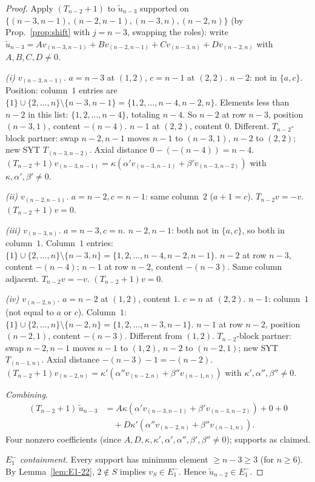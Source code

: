 \documentclass[11pt]{article}
\theoremstyle{definition}
\begin{document}
\begin{proof}
Apply $(T_{n-2}{+}1)$ to $\widetilde{u}_{n-3}$ supported on
$\{(n-3,n-1),(n-2,n-1),(n-3,n),(n-2,n)\}$ (by Prop.~\ref{prop:shift}
with $j = n-3$, swapping the roles): write
$\widetilde{u}_{n-3} = A v_{(n-3,n-1)} + B v_{(n-2,n-1)}
+ C v_{(n-3,n)} + D v_{(n-2,n)}$ with $A,B,C,D \ne 0$.

\emph{(i) $v_{(n-3,n-1)}$.} $a = n-3$ at $(1,2)$, $c = n-1$ at $(2,2)$.
$n-2$: not in $\{a, c\}$.  Position: column~$1$ entries are
$\{1\}\cup\{2,\ldots,n\}\setminus\{n-3,n-1\} =
\{1,2,\ldots,n-4,n-2,n\}$.  Elements less than $n-2$ in this list:
$\{1,2,\ldots,n-4\}$, totaling $n-4$.  So $n-2$ at row $n-3$, position
$(n-3,1)$, content $-(n-4)$.  $n-1$ at $(2,2)$, content $0$.
Different.  $T_{n-2}$-block partner: swap $n-2, n-1$ moves $n-1$ to
$(n-3,1)$, $n-2$ to $(2,2)$; new SYT $T_{(n-3,n-2)}$.  Axial distance
$0 - (-(n-4)) = n-4$.
$(T_{n-2}{+}1)v_{(n-3,n-1)} = \kappa(\alpha'v_{(n-3,n-1)} +
\beta'v_{(n-3,n-2)})$ with $\kappa,\alpha',\beta' \ne 0$.

\emph{(ii) $v_{(n-2,n-1)}$.} $a = n-2, c = n-1$: same column~$2$
($a + 1 = c$).  $T_{n-2}v = -v$.  $(T_{n-2}{+}1)v = 0$.

\emph{(iii) $v_{(n-3,n)}$.} $a = n-3, c = n$.  $n-2,n-1$: both not in
$\{a,c\}$, so both in column~$1$.  Column~$1$ entries:
$\{1\}\cup\{2,\ldots,n\}\setminus\{n-3,n\} = \{1,2,\ldots,n-4,n-2,n-1\}$.
$n-2$ at row $n-3$, content $-(n-4)$; $n-1$ at row $n-2$, content
$-(n-3)$.  Same column adjacent.  $T_{n-2}v = -v$.
$(T_{n-2}{+}1)v = 0$.

\emph{(iv) $v_{(n-2,n)}$.} $a = n-2$ at $(1,2)$, content $1$.
$c = n$ at $(2,2)$.  $n-1$: column~$1$ (not equal to $a$ or $c$).
Column~$1$: $\{1\}\cup\{2,\ldots,n\}\setminus\{n-2,n\} =
\{1,2,\ldots,n-3,n-1\}$.  $n-1$ at row $n-2$, position $(n-2,1)$,
content $-(n-3)$.  Different from $(1,2)$.  $T_{n-2}$-block partner:
swap $n-2, n-1$ moves $n-1$ to $(1,2)$, $n-2$ to $(n-2,1)$; new SYT
$T_{(n-1,n)}$.  Axial distance $-(n-3)-1 = -(n-2)$.
$(T_{n-2}{+}1)v_{(n-2,n)} = \kappa'(\alpha''v_{(n-2,n)} +
\beta''v_{(n-1,n)})$ with $\kappa',\alpha'',\beta'' \ne 0$.

\emph{Combining.}
\begin{align*}
   (T_{n-2}{+}1)\,\widetilde{u}_{n-3}
   &= A\kappa(\alpha'v_{(n-3,n-1)} + \beta'v_{(n-3,n-2)}) + 0 + 0 \\
   &\quad + D\kappa'(\alpha''v_{(n-2,n)} + \beta''v_{(n-1,n)}).
\end{align*}
Four nonzero coefficients (since $A,D,\kappa,\kappa',\alpha',\alpha'',\beta',\beta''
\ne 0$); supports as claimed.

\emph{$E_1^-$ containment.}  Every support has minimum element
$\ge n-3 \ge 3$ (for $n \ge 6$).  By Lemma~\ref{lem:E1-22},
$2 \notin S$ implies $v_S \in E_1^-$.  Hence $\widetilde{u}_{n-2} \in E_1^-$.
\end{proof}
\end{document}
